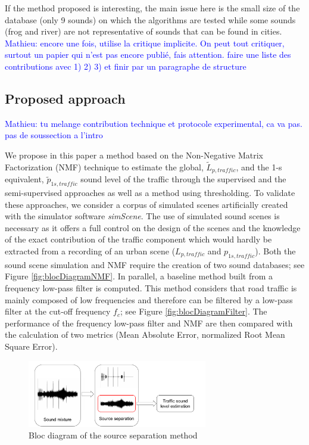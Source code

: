 \documentclass[twocolumn,a4paper,10pt]{article}
\newcommand{\ml}[1]{\textcolor{blue}{ Mathieu: #1}}
\begin{document}
 If the method proposed is interesting, the main issue here is the small size of the database (only 9 sounds) on which the algorithms are tested while some sounds (frog and river) are not representative of sounds that can be found in cities.
 \ml{encore une fois, utilise la critique implicite. On peut tout critiquer, surtout un papier qui n'est pas encore publié, fais attention. faire une liste des contributions avec 1) 2) 3) et finir par un paragraphe de structure}

\subsection{Proposed approach}

\ml{tu melange contribution technique et protocole experimental, ca va pas. pas de soussection a l'intro}

We propose in this paper a method based on the Non-Negative Matrix Factorization (NMF) technique to estimate the global, $\tilde{L}_{p,traffic}$, and the 1-s equivalent, $\tilde{p}_{1s,traffic}$ sound level of the traffic through the supervised and the semi-supervised approaches as well as a method using thresholding. To validate these approaches, we consider a corpus of simulated scenes artificially created with the simulator software \textit{simScene}. The use of simulated sound scenes is necessary as it offers a full control on the design of the scenes and the knowledge of the exact contribution of the traffic component which would hardly be extracted from a recording of an urban scene ($L_{p,traffic}$ and $p_{1s,traffic}$). Both the sound scene simulation and NMF require the creation of two sound databases; see Figure \ref{fig:blocDiagramNMF}. In parallel, a baseline method built from a frequency low-pass filter is computed. This method considers that road traffic is mainly composed of low frequencies and therefore can be filtered by a low-pass filter at the cut-off frequency $f_c$; see Figure \ref{fig:blocDiagramFilter}. The performance of the frequency low-pass filter and NMF are then compared with the calculation of two metrics (Mean Absolute Error, normalized Root Mean Square Error).

\begin{figure}[t]
\centering
\includegraphics[width=0.7\textwidth]{figures/bloc_diagram_source_separation.pdf}
\caption{Bloc diagram of the source separation method}
\end{figure}
\end{document}

